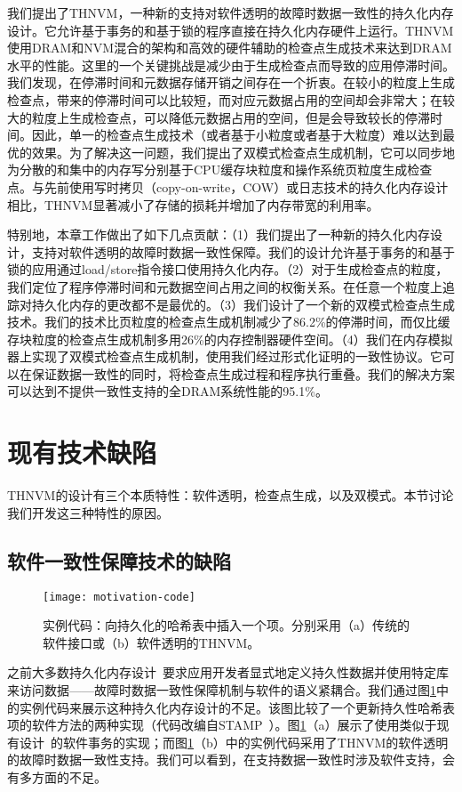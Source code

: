 我们提出了THNVM，一种新的支持对软件透明的故障时数据一致性的持久化内存设计。它允许基于事务的和基于锁的程序直接在持久化内存硬件上运行。THNVM使用DRAM和NVM混合的架构和高效的硬件辅助的检查点生成技术来达到DRAM水平的性能。这里的一个关键挑战是减少由于生成检查点而导致的应用停滞时间。我们发现，在停滞时间和元数据存储开销之间存在一个折衷。在较小的粒度上生成检查点，带来的停滞时间可以比较短，而对应元数据占用的空间却会非常大；在较大的粒度上生成检查点，可以降低元数据占用的空间，但是会导致较长的停滞时间。因此，单一的检查点生成技术（或者基于小粒度或者基于大粒度）难以达到最优的效果。为了解决这一问题，我们提出了双模式检查点生成机制，它可以同步地为分散的和集中的内存写分别基于CPU缓存块粒度和操作系统页粒度生成检查点。与先前使用写时拷贝（copy-on-write，COW）或日志技术的持久化内存设计相比，THNVM显著减小了存储的损耗并增加了内存带宽的利用率。

特别地，本章工作做出了如下几点贡献：（1）我们提出了一种新的持久化内存设计，支持对软件透明的故障时数据一致性保障。我们的设计允许基于事务的和基于锁的应用通过load/store指令接口使用持久化内存。（2）对于生成检查点的粒度，我们定位了程序停滞时间和元数据空间占用之间的权衡关系。在任意一个粒度上追踪对持久化内存的更改都不是最优的。（3）我们设计了一个新的双模式检查点生成技术。我们的技术比页粒度的检查点生成机制减少了86.2\%的停滞时间，而仅比缓存块粒度的检查点生成机制多用26\%的内存控制器硬件空间。（4）我们在内存模拟器上实现了双模式检查点生成机制，使用我们经过形式化证明的一致性协议。它可以在保证数据一致性的同时，将检查点生成过程和程序执行重叠。我们的解决方案可以达到不提供一致性支持的全DRAM系统性能的95.1\%。

\section{现有技术缺陷}

THNVM的设计有三个本质特性：软件透明，检查点生成，以及双模式。本节讨论我们开发这三种特性的原因。

\subsection{软件一致性保障技术的缺陷}

\begin{figure}[t]
\centering \texttt{[image: motivation-code]}
  \caption{实例代码：向持久化的哈希表中插入一个项。分别采用（a）传统的软件接口或（b）软件透明的THNVM。}
\label{fig:motivation-code}
\end{figure}

之前大多数持久化内存设计~\cite{Condit:2009:BIT:1629575.1629589,Volos:2011:MLP:1950365.1950379,Coburn:2011:NMP:1950365.1950380,Zhao:2013:KCP:2540708.2540744,Venkataraman:2011:CDD:1960475.1960480}要求应用开发者显式地定义持久性数据并使用特定库来访问数据——故障时数据一致性保障机制与软件的语义紧耦合。我们通过图\ref{fig:motivation-code}中的实例代码来展示这种持久化内存设计的不足。该图比较了一个更新持久性哈希表项的软件方法的两种实现（代码改编自STAMP~\cite{Cao:2008:STA}）。图\ref{fig:motivation-code}（a）展示了使用类似于现有设计~\cite{Condit:2009:BIT:1629575.1629589, Volos:2011:MLP:1950365.1950379}的软件事务的实现；而图\ref{fig:motivation-code}（b）中的实例代码采用了THNVM的软件透明的故障时数据一致性支持。我们可以看到，在支持数据一致性时涉及软件支持，会有多方面的不足。

